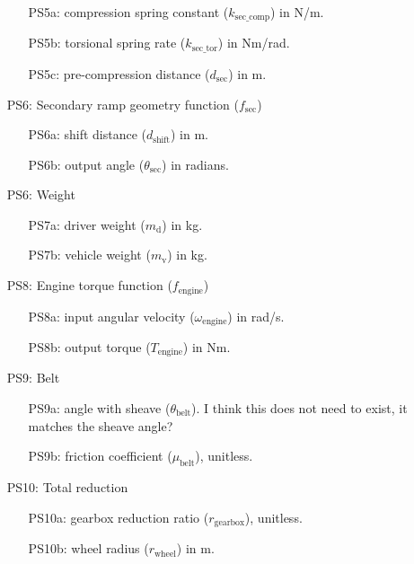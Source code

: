 \documentclass[12pt]{article}
\begin{document}
\begin{itemize}
\begin{itemize}
  \item [PS5a:] compression spring constant ($k_{\text{sec\_comp}}$) in N/m.
  \item [PS5b:] torsional spring rate ($k_{\text{sec\_tor}}$) in Nm/rad.
  \item [PS5c:] pre-compression distance ($d_{\text{sec}}$) in m.
\end{itemize}

\item[PS6:] Secondary ramp geometry function ($f_{\text{sec}}$)

\begin{itemize}
  \item [PS6a:] shift distance ($d_{\text{shift}}$) in m.
  \item [PS6b:] output angle ($\theta_{\text{sec}}$) in radians.
\end{itemize}

\item[PS6:] Weight

\begin{itemize}
  \item [PS7a:] driver weight ($m_{\text{d}}$) in kg.
  \item [PS7b:] vehicle weight ($m_{\text{v}}$) in kg.
\end{itemize}

\item[PS8:] Engine torque function ($f_{\text{engine}}$)

\begin{itemize}
  \item [PS8a:] input angular velocity ($\omega_{\text{engine}}$) in rad/s.
  \item [PS8b:] output torque ($T_{\text{engine}}$) in Nm.
\end{itemize}

\item[PS9:] Belt

\begin{itemize}
  \item [PS9a:] angle with sheave ($\theta_{\text{belt}}$). I think this does not need to exist, it matches the sheave angle?
  \item [PS9b:] friction coefficient ($\mu_{\text{belt}}$), unitless.
\end{itemize}

\item[PS10:] Total reduction

\begin{itemize}
  \item [PS10a:] gearbox reduction ratio ($r_{\text{gearbox}}$), unitless.
  \item [PS10b:] wheel radius ($r_{\text{wheel}}$) in m.
\end{itemize}


\end{itemize}
\end{document}
